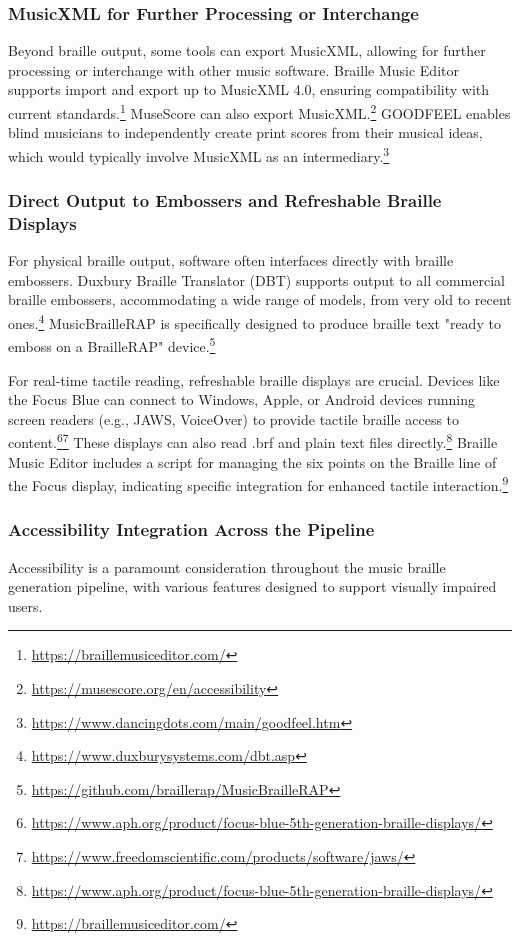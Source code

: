 \subsubsection{MusicXML for Further Processing or Interchange}
Beyond braille output, some tools can export MusicXML, allowing for further processing or interchange with other music software. Braille Music Editor supports import and export up to MusicXML 4.0, ensuring compatibility with current standards.\footnote{\url{https://braillemusiceditor.com/}} MuseScore can also export MusicXML.\footnote{\url{https://musescore.org/en/accessibility}} GOODFEEL enables blind musicians to independently create print scores from their musical ideas, which would typically involve MusicXML as an intermediary.\footnote{\url{https://www.dancingdots.com/main/goodfeel.htm}}

\subsubsection{Direct Output to Embossers and Refreshable Braille Displays}
For physical braille output, software often interfaces directly with braille embossers. Duxbury Braille Translator (DBT) supports output to all commercial braille embossers, accommodating a wide range of models, from very old to recent ones.\footnote{\url{https://www.duxburysystems.com/dbt.asp}} MusicBrailleRAP is specifically designed to produce braille text "ready to emboss on a BrailleRAP" device.\footnote{\url{https://github.com/braillerap/MusicBrailleRAP}}

For real-time tactile reading, refreshable braille displays are crucial. Devices like the Focus Blue can connect to Windows, Apple, or Android devices running screen readers (e.g., JAWS, VoiceOver) to provide tactile braille access to content.\footnote{\url{https://www.aph.org/product/focus-blue-5th-generation-braille-displays/}}\footnote{\url{https://www.freedomscientific.com/products/software/jaws/}} These displays can also read .brf and plain text files directly.\footnote{\url{https://www.aph.org/product/focus-blue-5th-generation-braille-displays/}} Braille Music Editor includes a script for managing the six points on the Braille line of the Focus display, indicating specific integration for enhanced tactile interaction.\footnote{\url{https://braillemusiceditor.com/}}

\subsubsection{Accessibility Integration Across the Pipeline}
Accessibility is a paramount consideration throughout the music braille generation pipeline, with various features designed to support visually impaired users.


